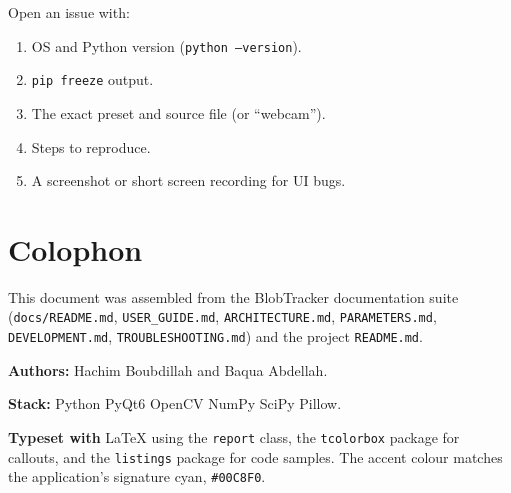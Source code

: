 \documentclass[11pt,a4paper,openany]{report}
\begin{document}
Open an issue with:

\begin{enumerate}
    \item OS and Python version (\texttt{python --version}).
    \item \texttt{pip freeze} output.
    \item The exact preset and source file (or ``webcam'').
    \item Steps to reproduce.
    \item A screenshot or short screen recording for UI bugs.
\end{enumerate}

\chapter*{Colophon}

This document was assembled from the BlobTracker documentation suite
(\texttt{docs/README.md}, \texttt{USER\_GUIDE.md}, \texttt{ARCHITECTURE.md},
\texttt{PARAMETERS.md}, \texttt{DEVELOPMENT.md}, \texttt{TROUBLESHOOTING.md})
and the project \texttt{README.md}.

\bigskip

\noindent\textsf{\textbf{Authors:} Hachim Boubdillah and Baqua Abdellah.}

\bigskip

\noindent\textsf{\textbf{Stack:} Python \textbullet{} PyQt6 \textbullet{}
OpenCV \textbullet{} NumPy \textbullet{} SciPy \textbullet{} Pillow.}

\bigskip

\noindent\textsf{\textbf{Typeset with} \LaTeX{} using the \texttt{report}
class, the \texttt{tcolorbox} package for callouts, and the
\texttt{listings} package for code samples. The accent colour matches the
application's signature cyan, \texttt{\#00C8F0}.}

\end{document}
